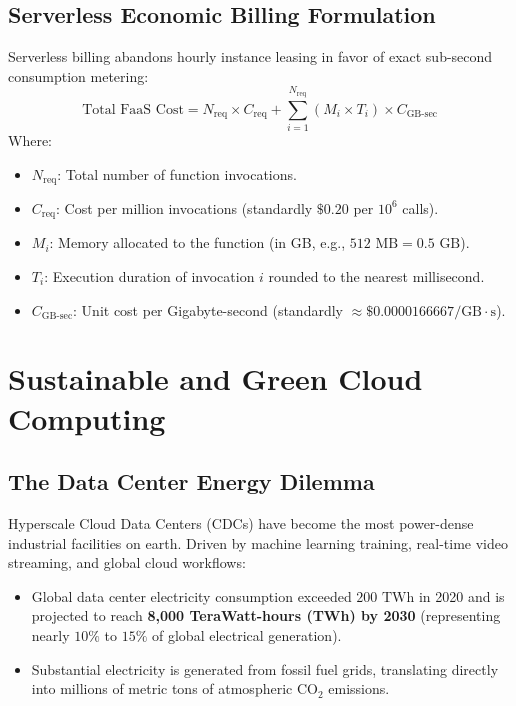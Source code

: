\documentclass[11pt,a4paper,openany]{report}
\begin{document}
\subsection{Serverless Economic Billing Formulation}
Serverless billing abandons hourly instance leasing in favor of exact sub-second consumption metering:
\begin{equation}
\text{Total FaaS Cost} = N_{\text{req}} \times C_{\text{req}} + \sum_{i=1}^{N_{\text{req}}} \left( M_i \times T_i \right) \times C_{\text{GB-sec}}
\end{equation}
Where:
\begin{itemize}[leftmargin=*]
  \item $N_{\text{req}}$: Total number of function invocations.
  \item $C_{\text{req}}$: Cost per million invocations (standardly $\$0.20$ per $10^6$ calls).
  \item $M_i$: Memory allocated to the function (in GB, e.g., $512\text{ MB} = 0.5\text{ GB}$).
  \item $T_i$: Execution duration of invocation $i$ rounded to the nearest millisecond.
  \item $C_{\text{GB-sec}}$: Unit cost per Gigabyte-second (standardly $\approx \$0.0000166667 / \text{GB}\cdot\text{s}$).
\end{itemize}

\section{Sustainable and Green Cloud Computing}
\subsection{The Data Center Energy Dilemma}
Hyperscale Cloud Data Centers (CDCs) have become the most power-dense industrial facilities on earth. Driven by machine learning training, real-time video streaming, and global cloud workflows:
\begin{itemize}[leftmargin=*]
  \item Global data center electricity consumption exceeded $200\text{ TWh}$ in 2020 and is projected to reach \textbf{8,000 TeraWatt-hours (TWh) by 2030} (representing nearly $10\%$ to $15\%$ of global electrical generation).
  \item Substantial electricity is generated from fossil fuel grids, translating directly into millions of metric tons of atmospheric $\text{CO}_2$ emissions.
\end{itemize}
\end{document}
